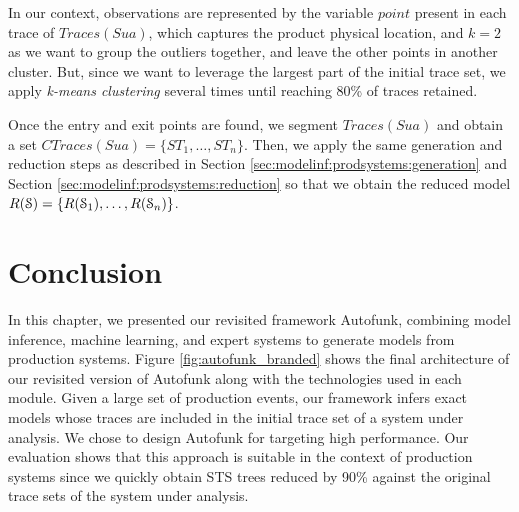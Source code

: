 In our context, observations are represented by the variable
$point$ present in each trace of $Traces({Sua})$, which captures
the product physical location, and $k=2$ as we want to group the
outliers together, and leave the other points in another cluster.
But, since we want to leverage the largest part of the initial
trace set, we apply \textit{k-means clustering} several times
until reaching 80\% of traces retained.

Once the entry and exit points are found, we segment
$Traces({Sua})$ and obtain a set $CTraces({Sua})=\{ST_1, \dots,
ST_n\}$. Then, we apply the same generation and reduction steps
as described in Section \ref{sec:modelinf:prodsystems:generation}
and Section \ref{sec:modelinf:prodsystems:reduction} so that we
obtain the reduced model $R(\EuScript{S}) =
\{R(\EuScript{S}_1),\dots,R(\EuScript{S}_n)\}$.


\section{Conclusion}
\label{sec:modelinf:prodsystems:conclusion}

In this chapter, we presented our revisited framework Autofunk,
combining model inference, machine learning, and expert systems
to generate models from production systems. Figure
\ref{fig:autofunk_branded} shows the final architecture of our
revisited version of Autofunk along with the technologies used in
each module. Given a large set of production events, our
framework infers exact models whose traces are included in the
initial trace set of a system under analysis.  We chose to design
Autofunk for targeting high performance. Our evaluation shows
that this approach is suitable in the context of production
systems since we quickly obtain STS trees reduced by 90\% against
the original trace sets of the system under analysis.

